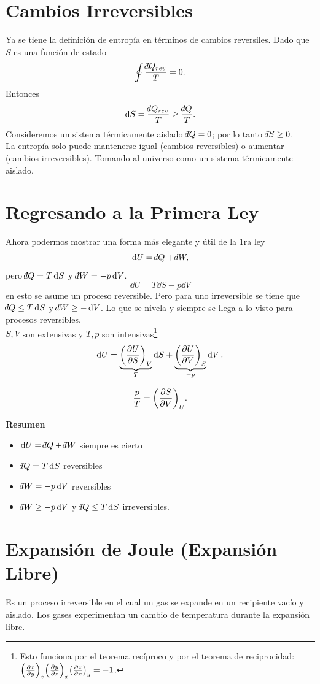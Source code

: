 \section{Cambios Irreversibles}
Ya se tiene la definición de entropía en términos de cambios reversiles. Dado que $S$ es una función de estado
	$$ \oint \frac{\dbar Q_{rev}}{T} = 0. $$
Entonces
	$$ \dd{S} = \frac{\dbar Q_{rev}}{T} \geq \frac{\dbar Q}{T}. $$
Consideremos un sistema térmicamente aislado $\dbar Q = 0$; por lo tanto $\dbar S \geq 0$. \\

La entropía solo puede mantenerse igual (cambios reversibles) o aumentar (cambios irreversibles). Tomando al universo como un sistema térmicamente aislado.


\section{Regresando a la Primera Ley}
Ahora podermos mostrar una forma más elegante y útil de la 1ra ley
	$$ \dd{U} = \dbar Q + \dbar W, $$
pero $\dbar Q = T\dd{S}$ y $\dbar W = -p\dd{V}$.
	$$ \dd{U} = T\dd{S} - p\dd{V} $$
en esto se asume un proceso reversible. Pero para uno irreversible se tiene que $\dbar Q \leq T\dd{S}$ y $\dbar W \geq -\dd{V}$. Lo que se nivela y siempre se llega a lo visto para procesos reversibles. \\

$S,V$ son extensivas y $T,p$ son intensivas\footnote{Esto funciona por el teorema recíproco y por el teorema de reciprocidad: $\qty(\pdv{x}{y})_z \qty(\pdv{y}{z})_x \qty(\pdv{z}{x})_y = -1$.}
	$$ \dd{U} = \underbrace{\qty(\pdv{U}{S})_V}_{T} \dd{S} + \underbrace{\qty(\pdv{U}{V})_S}_{-p} \dd{V}. $$
	

	$$ \frac{p}{T} = \qty(\pdv{S}{V})_U. $$
	


{\Large \textbf{Resumen}} \\
\begin{itemize}
	\item $\dd{U} = \dbar Q + \dbar W$ siempre es cierto
	\item $\dbar Q = T\dd{S}$ reversibles
	\item $\dbar W = -p\dd{V}$ reversibles
	\item $\dbar W \geq -p\dd{V}$ y $\dbar Q \leq T\dd{S}$ irreversibles.
\end{itemize}


\section{Expansión de Joule (Expansión Libre)}
Es un proceso irreversible en el cual un gas se expande en un recipiente vacío y aislado. Los gases experimentan un cambio de temperatura durante la expansión libre.


